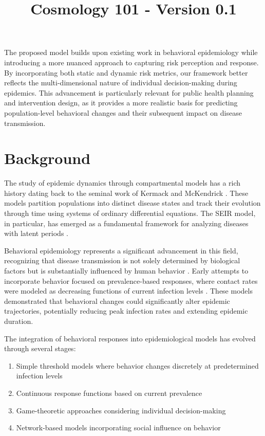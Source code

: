 \documentclass{article}\usepackage{graphicx} \usepackage{amsmath} \usepackage{colortbl}\title{Cosmology 101 - Version 0.1}
\begin{document}
The proposed model builds upon existing work in behavioral epidemiology \cite{verelst2016behavioural} while introducing a more nuanced approach to capturing risk perception and response. By incorporating both static and dynamic risk metrics, our framework better reflects the multi-dimensional nature of individual decision-making during epidemics. This advancement is particularly relevant for public health planning and intervention design, as it provides a more realistic basis for predicting population-level behavioral changes and their subsequent impact on disease transmission.\section{Background}
The study of epidemic dynamics through compartmental models has a rich history dating back to the seminal work of Kermack and McKendrick \cite{anderson1992infectious}. These models partition populations into distinct disease states and track their evolution through time using systems of ordinary differential equations. The SEIR model, in particular, has emerged as a fundamental framework for analyzing diseases with latent periods \cite{hethcote2000mathematics}.

Behavioral epidemiology represents a significant advancement in this field, recognizing that disease transmission is not solely determined by biological factors but is substantially influenced by human behavior \cite{verelst2016behavioural}. Early attempts to incorporate behavior focused on prevalence-based responses, where contact rates were modeled as decreasing functions of current infection levels \cite{funk2010modelling}. These models demonstrated that behavioral changes could significantly alter epidemic trajectories, potentially reducing peak infection rates and extending epidemic duration.

The integration of behavioral responses into epidemiological models has evolved through several stages:


\begin{enumerate}
\item Simple threshold models where behavior changes discretely at predetermined infection levels
\item Continuous response functions based on current prevalence
\item Game-theoretic approaches considering individual decision-making
\item Network-based models incorporating social influence on behavior
\end{enumerate}
\end{document}
